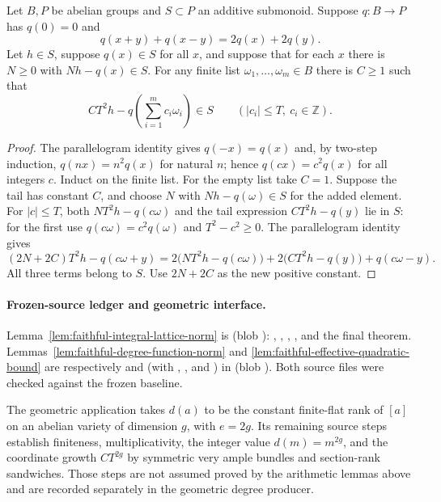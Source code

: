 \begin{srlemma}
\label{lem:faithful-effective-quadratic-bound}
Let \(B,P\) be abelian groups and \(S\subset P\) an additive
submonoid.  Suppose \(q:B\to P\) has \(q(0)=0\) and
\[
                q(x+y)+q(x-y)=2q(x)+2q(y).
\]
Let \(h\in S\), suppose \(q(x)\in S\) for all \(x\), and suppose
that for each \(x\) there is \(N\ge0\) with \(Nh-q(x)\in S\).
For any finite list \(\omega_1,\ldots,\omega_m\in B\) there is
\(C\ge1\) such that
\[
  CT^2h-q\!\left(\sum_{i=1}^m c_i\omega_i\right)\in S
                    \qquad (|c_i|\le T,\ c_i\in\mathbb Z).
 \tag{NN5}\label{eq:faithful-effective-quadratic-bound}
\]
\end{srlemma}
\begin{proof}
The parallelogram identity gives \(q(-x)=q(x)\) and, by
two-step induction, \(q(nx)=n^2q(x)\) for natural \(n\);
hence \(q(cx)=c^2q(x)\) for all integers \(c\).
Induct on the finite list.
For the empty list take \(C=1\).
Suppose the tail has constant \(C\), and choose \(N\) with
\(Nh-q(\omega)\in S\) for the added element.
For \(|c|\le T\), both
\(NT^2h-q(c\omega)\) and the tail expression
\(CT^2h-q(y)\) lie in \(S\): for the first use
\(q(c\omega)=c^2q(\omega)\) and \(T^2-c^2\ge0\).
The parallelogram identity gives
\[
 (2N+2C)T^2h-q(c\omega+y)
  =2\bigl(NT^2h-q(c\omega)\bigr)
   +2\bigl(CT^2h-q(y)\bigr)+q(c\omega-y).
\]
All three terms belong to \(S\).
Use \(2N+2C\) as the new positive constant.
\end{proof}

\paragraph{Frozen-source ledger and geometric interface.}
Lemma~\ref{lem:faithful-integral-lattice-norm} is
\href{https://github.com/ChristianKudeba/alpoge-rh-verification/blob/alpoge-source-7cbf7a0c/src/Development/WeilBound/CoreStatements/TorusUniformisation/ChowMahlerFamilies/KernelRankNormBound.lean}
{}
(blob ):
, ,
, , and the final theorem.
Lemmas~\ref{lem:faithful-degree-function-norm} and
\ref{lem:faithful-effective-quadratic-bound} are respectively
 and  (with
, , and
) in
\href{https://github.com/ChristianKudeba/alpoge-rh-verification/blob/alpoge-source-7cbf7a0c/src/Development/WeilBound/CoreStatements/TorusUniformisation/ChowMahlerFamilies/DegreeMultiplicationNorm.lean}
{}
(blob ).
Both source files were checked against the frozen baseline.

The geometric application takes \(d(a)\) to be the constant
finite-flat rank of \([a]\) on an abelian variety of dimension
\(g\), with \(e=2g\).
Its remaining source steps establish finiteness, multiplicativity,
the integer value \(d(m)=m^{2g}\), and the coordinate growth
\(CT^{2g}\) by symmetric very ample bundles and section-rank
sandwiches.  Those steps are not assumed proved by the arithmetic
lemmas above and are recorded separately in the geometric degree
producer.
